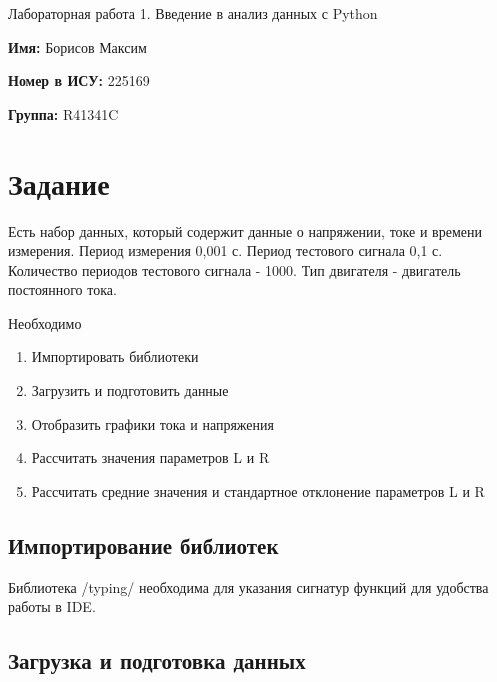 \documentclass[14pt]{extarticle}
\begin{document}
    \begin{center}
        \Large Лабораторная работа 1. Введение в анализ данных с Python
    \end{center}
    \begin{flushleft}
        \textbf{Имя:} Борисов Максим

        \vspace{1em}
        \textbf{Номер в ИСУ:} 225169

        \vspace{1em}
        \textbf{Группа:} R41341C
    \end{flushleft}

    \section*{Задание}
    Есть набор данных, который содержит данные о напряжении, токе и времени измерения. Период измерения 0,001 с.
    Период тестового сигнала 0,1 с. Количество периодов тестового сигнала - 1000. Тип двигателя - двигатель
    постоянного тока.

    \vspace{1em}
    Необходимо
    \begin{enumerate}
        \item Импортировать библиотеки
        \item Загрузить и подготовить данные
        \item Отобразить графики тока и напряжения
        \item Рассчитать значения параметров L и R
        \item Рассчитать средние значения и стандартное отклонение параметров L и R
    \end{enumerate}

    \pagebreak

    \subsection{Импортирование библиотек}
    Библиотека \pythoninline/typing/ необходима для указания сигнатур функций для удобства работы в IDE.

    \subsection{Загрузка и подготовка данных}
\end{document}
